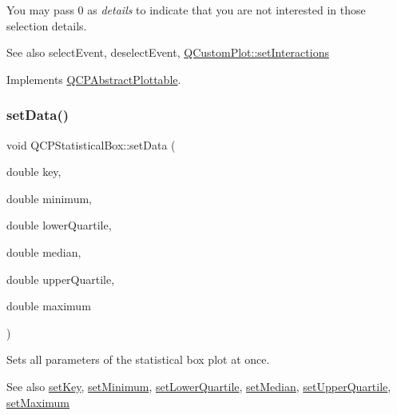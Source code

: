 You may pass 0 as {\itshape details} to indicate that you are not interested in those selection details.

\begin{DoxySeeAlso}{See also}
select\+Event, deselect\+Event, \mbox{\hyperlink{class_q_custom_plot_a5ee1e2f6ae27419deca53e75907c27e5}{Q\+Custom\+Plot\+::set\+Interactions}} 
\end{DoxySeeAlso}


Implements \mbox{\hyperlink{class_q_c_p_abstract_plottable_a38efe9641d972992a3d44204bc80ec1d}{Q\+C\+P\+Abstract\+Plottable}}.

\mbox{\label{class_q_c_p_statistical_box_adf50c57b635edb12470c0e4a986aff37}} 
\subsubsection{\texorpdfstring{set\+Data()}{setData()}}
{\footnotesize\ttfamily void Q\+C\+P\+Statistical\+Box\+::set\+Data (\begin{DoxyParamCaption}\item[{double}]{key,  }\item[{double}]{minimum,  }\item[{double}]{lower\+Quartile,  }\item[{double}]{median,  }\item[{double}]{upper\+Quartile,  }\item[{double}]{maximum }\end{DoxyParamCaption})}

Sets all parameters of the statistical box plot at once.

\begin{DoxySeeAlso}{See also}
\mbox{\hyperlink{class_q_c_p_statistical_box_a84a1c6d34b2f9af40bca0c527d51e97e}{set\+Key}}, \mbox{\hyperlink{class_q_c_p_statistical_box_a84ff7cc61ba44890f0c3e0c99c19941e}{set\+Minimum}}, \mbox{\hyperlink{class_q_c_p_statistical_box_a680941af5e23d902013962fa67223f9e}{set\+Lower\+Quartile}}, \mbox{\hyperlink{class_q_c_p_statistical_box_a65970e77a897da4ecb4b15300868aad3}{set\+Median}}, \mbox{\hyperlink{class_q_c_p_statistical_box_a65a1375f941c5a2077b5201229e89346}{set\+Upper\+Quartile}}, \mbox{\hyperlink{class_q_c_p_statistical_box_acec5ad1901f00f2c5387cfb4d9787eb3}{set\+Maximum}} 
\end{DoxySeeAlso}
\mbox{\label{class_q_c_p_statistical_box_a84a1c6d34b2f9af40bca0c527d51e97e}} 
